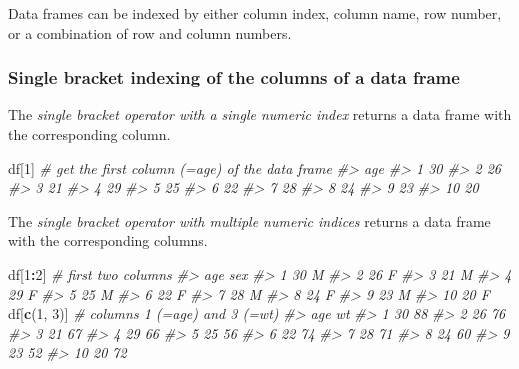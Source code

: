 \documentclass[]{book}
\newenvironment{Shaded}{\begin{snugshade}}{\end{snugshade}}
\newcommand{\CommentTok}[1]{\textcolor[rgb]{0.56,0.35,0.01}{\textit{#1}}}
\newcommand{\DecValTok}[1]{\textcolor[rgb]{0.00,0.00,0.81}{#1}}
\newcommand{\KeywordTok}[1]{\textcolor[rgb]{0.13,0.29,0.53}{\textbf{#1}}}
\newcommand{\NormalTok}[1]{#1}
\newcommand{\OperatorTok}[1]{\textcolor[rgb]{0.81,0.36,0.00}{\textbf{#1}}}
\theoremstyle{definition}
\theoremstyle{definition}
\theoremstyle{definition}
\theoremstyle{remark}
\begin{document}
Data frames can be indexed by either column index, column name, row
number, or a combination of row and column numbers.

\hypertarget{single-bracket-indexing-of-the-columns-of-a-data-frame}{%
\subsubsection{Single bracket indexing of the columns of a data
frame}\label{single-bracket-indexing-of-the-columns-of-a-data-frame}}

The \emph{single bracket operator with a single numeric index} returns a
data frame with the corresponding column.

\begin{Shaded}
\begin{Highlighting}[]
\NormalTok{df[}\DecValTok{1}\NormalTok{]  }\CommentTok{# get the first column (=age) of the data frame}
\CommentTok{#>    age}
\CommentTok{#> 1   30}
\CommentTok{#> 2   26}
\CommentTok{#> 3   21}
\CommentTok{#> 4   29}
\CommentTok{#> 5   25}
\CommentTok{#> 6   22}
\CommentTok{#> 7   28}
\CommentTok{#> 8   24}
\CommentTok{#> 9   23}
\CommentTok{#> 10  20}
\end{Highlighting}
\end{Shaded}

The \emph{single bracket operator with multiple numeric indices} returns
a data frame with the corresponding columns.

\begin{Shaded}
\begin{Highlighting}[]
\NormalTok{df[}\DecValTok{1}\OperatorTok{:}\DecValTok{2}\NormalTok{]  }\CommentTok{# first two columns}
\CommentTok{#>    age sex}
\CommentTok{#> 1   30   M}
\CommentTok{#> 2   26   F}
\CommentTok{#> 3   21   M}
\CommentTok{#> 4   29   F}
\CommentTok{#> 5   25   M}
\CommentTok{#> 6   22   F}
\CommentTok{#> 7   28   M}
\CommentTok{#> 8   24   F}
\CommentTok{#> 9   23   M}
\CommentTok{#> 10  20   F}
\NormalTok{df[}\KeywordTok{c}\NormalTok{(}\DecValTok{1}\NormalTok{, }\DecValTok{3}\NormalTok{)]  }\CommentTok{# columns 1 (=age) and 3 (=wt)}
\CommentTok{#>    age wt}
\CommentTok{#> 1   30 88}
\CommentTok{#> 2   26 76}
\CommentTok{#> 3   21 67}
\CommentTok{#> 4   29 66}
\CommentTok{#> 5   25 56}
\CommentTok{#> 6   22 74}
\CommentTok{#> 7   28 71}
\CommentTok{#> 8   24 60}
\CommentTok{#> 9   23 52}
\CommentTok{#> 10  20 72}
\end{Highlighting}
\end{Shaded}
\end{document}
